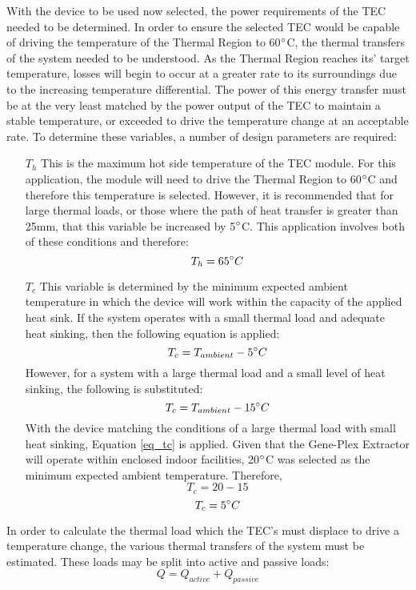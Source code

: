 With the device to be used now selected, the power requirements of the TEC needed to be determined. In order to ensure the selected TEC would be capable of driving the temperature of the Thermal Region to 60$\degree$C, the thermal transfers of the system needed to be understood. As the Thermal Region reaches its' target temperature, losses will begin to occur at a greater rate to its surroundings due to the increasing temperature differential. The power of this energy transfer must be at the very least matched by the power output of the TEC to maintain a stable temperature, or exceeded to drive the temperature change at an acceptable rate. To determine these variables, a number of design parameters are required:
\begin{enumerate}
	\item [$T_h$] This is the maximum hot side temperature of the TEC module. For this application, the module will need to drive the Thermal Region to 60$\degree$C and therefore this temperature is selected. However, it is recommended that for large thermal loads, or those where the path of heat transfer is greater than 25mm, that this variable be increased by 5$\degree$C. This application involves both of these conditions and therefore:
	$$T_h = 65\degree C$$
	\item[$T_c$] This variable is determined by the minimum expected ambient temperature in which the device will work within the capacity of the applied heat sink. If the system operates with a small thermal load and adequate heat sinking, then the following equation is applied:
	\begin{equation}
	T_c = T_{ambient} - 5\degree C
	\end{equation}
	However, for a system with a large thermal load and a small level of heat sinking, the following is substituted:
	\begin{equation}
	\label{eq_tc}
	T_c = T_{ambient} - 15\degree C
	\end{equation}
	With the device matching the conditions of a large thermal load with small heat sinking, Equation \ref{eq_tc} is applied. Given that the Gene-Plex Extractor will operate within enclosed indoor facilities, 20$\degree$C was selected as the minimum expected ambient temperature. Therefore,
	$$ T_c = 20 - 15$$
	$$ T_c = 5\degree C $$
\end{enumerate}

In order to calculate the thermal load which the TEC's must displace to drive a temperature change, the various thermal transfers of the system must be estimated. These loads may be split into active and passive loads:
\begin{equation}
\label{eq_thermalload}
Q = Q_{active} + Q_{passive}
\end{equation}

